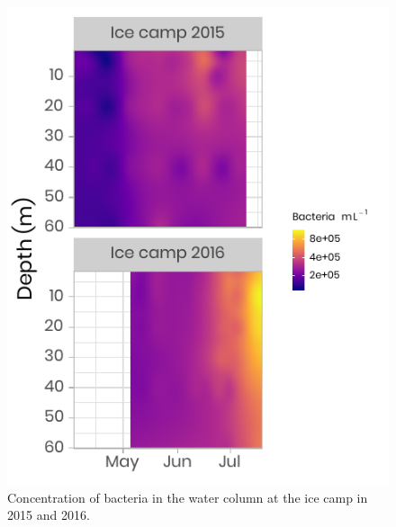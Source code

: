 \documentclass[12pt,a4paper]{scrartcl}
\begin{document}
\begin{figure}[h]
	\centering
	\includegraphics[scale = 2]{../../../graphs/fig8.pdf}
	\caption{Concentration of bacteria in the water column at the ice camp in 2015 and 2016.}
\end{figure}

\clearpage
\newpage
\end{document}
